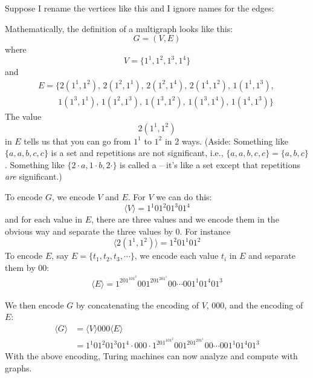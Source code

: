 Suppose I rename the vertices like this and I ignore names
for the edges:
\begin{center}
\end{center}
Mathematically, the definition of a multigraph
looks like this:
\[
G = (V, E)
\]
where
\[
V = \{1^1, 1^2, 1^3, 1^4\}
\]
and
\begin{align*}
E = \{2(1^1, 1^2),\, 2(1^2, 1^1),\, 2(1^2,1^4),\, 2(1^4,1^2),\, 1(1^1,1^3),\, \\
\hspace{1cm}     1(1^3,1^1),\, 1(1^2,1^3),\, 1(1^3,1^2),\, 1(1^3,1^4),\, 1(1^4,1^3) \}
\end{align*}
The value
\[
2(1^1, 1^2)
\]
in $E$ tells us that you can go from $1^1$ to $1^2$ in 2 ways.
(Aside: Something like $\{a, a, b, c, c\}$ is a set
and repetitions are not significant, i.e.,
$\{a, a, b, c, c\} = \{a, b, c\}$.
Something like
$\{2 \cdot a, 1 \cdot b, 2 \cdot\}$
is called a 
-- it's like a set except that
repetitions \textit{are} significant.)

To encode $G$, we encode $V$ and $E$.
For $V$ we can do this:
\[
\langle V \rangle = 1^1 0 1^2 0 1^3 0 1^4
\]
and for each value in $E$, there are three values and we encode them
in the obvious way and separate the three values by 0.
For instance
\[
\langle 2(1^1, 1^2) \rangle
=
1^2 0 1^1 0 1^2
\]
To encode $E$, say $E = \{t_1, t_2, t_3, \cdots\}$, we encode each value
$t_i$ in $E$
and separate them by $00$:
\begin{align*}
\langle E \rangle = 1^201^101^2 00 1^201^201^1 00 \cdots 00 1^1 0 1^4 0 1^3
\end{align*}

We then encode $G$ by concatenating the encoding of $V$, 000,
and the encoding of $E$:
\begin{align*}
\langle G \rangle
&= \langle V \rangle 000 \langle E \rangle \\
&= 1^1 0 1^2 0 1^3 0 1^4 \cdot 
   000 \cdot
1^201^101^2 00 1^201^201^1 00 \cdots 00 1^1 0 1^4 0 1^3
\end{align*}
With the above encoding, Turing machines can now analyze and compute with graphs.

